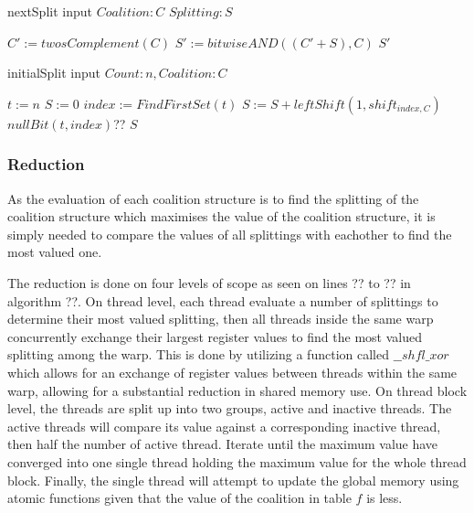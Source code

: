 \documentclass{aamas2012}
\begin{document}
\begin{algorithm}
\caption{{\secit nextSplit} input $Coalition:C$ $Splitting:S$}
\label{<your label for references later in your document>}
\begin{algorithmic}[1]
\STATE $C' := twosComplement(C)$
\STATE $S' := bitwiseAND((C'+S),C)$
\RETURN $S'$
\end{algorithmic}
\end{algorithm}

\begin{algorithm}
\caption{{\secit initialSplit} input $Count:n, Coalition:C$}
\label{<your label for references later in your document>}
\begin{algorithmic}[1]
\STATE $t := n$
\STATE $S := 0$
 {
\STATE $index := FindFirstSet(t)$
\STATE $S := S + leftShift(1,shift_{index,C})$
\STATE $nullBit(t,index)$??
}
\ENDWHILE
\RETURN $S$
\end{algorithmic}
\end{algorithm}



\subsubsection{Reduction} \label{reduction}
As the evaluation of each coalition structure is to find the splitting 
of the coalition structure which maximises the value of the coalition structure,
it is simply needed to compare the values of all splittings with eachother to find the most valued one. 

The reduction is done on four levels of scope as seen on lines ?? to ?? in algorithm ??. On thread level, 
each thread evaluate a number of splittings to determine their most valued splitting,
then all threads inside the same warp concurrently exchange their largest register values to find the most valued splitting among the warp.
This is done by utilizing a function called $\_\_shfl\_xor$ which allows for an exchange of register values between threads within the same warp,
allowing for a substantial reduction in shared memory use. 
On thread block level, the threads are split up into two groups, active and inactive threads. 
The active threads will compare its value against a corresponding inactive thread, then half the number of active thread.
Iterate until the maximum value have converged into one single thread holding the maximum value for the whole thread block.
Finally, the single thread will attempt to update the global memory using atomic functions 
given that the value of the coalition in table $f$  is less.
\end{document}
